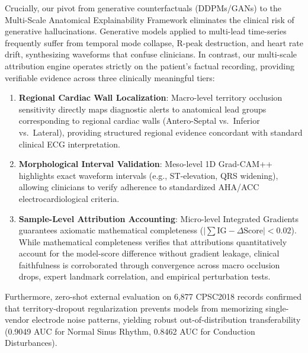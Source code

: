 \documentclass[12pt]{elsarticle}
\begin{document}
Crucially, our pivot from generative counterfactuals (DDPMs/GANs) to the Multi-Scale Anatomical Explainability Framework eliminates the clinical risk of generative hallucinations. Generative models applied to multi-lead time-series frequently suffer from temporal mode collapse, R-peak destruction, and heart rate drift, synthesizing waveforms that confuse clinicians. In contrast, our multi-scale attribution engine operates strictly on the patient's factual recording, providing verifiable evidence across three clinically meaningful tiers:
\begin{enumerate}
    \item \textbf{Regional Cardiac Wall Localization}: Macro-level territory occlusion sensitivity directly maps diagnostic alerts to anatomical lead groups corresponding to regional cardiac walls (Antero-Septal vs.\ Inferior vs.\ Lateral), providing structured regional evidence concordant with standard clinical ECG interpretation.
    \item \textbf{Morphological Interval Validation}: Meso-level 1D Grad-CAM++ highlights exact waveform intervals (e.g., ST-elevation, QRS widening), allowing clinicians to verify adherence to standardized AHA/ACC electrocardiological criteria.
    \item \textbf{Sample-Level Attribution Accounting}: Micro-level Integrated Gradients guarantees axiomatic mathematical completeness ($|\sum \text{IG} - \Delta \text{Score}| < 0.02$). While mathematical completeness verifies that attributions quantitatively account for the model-score difference without gradient leakage, clinical faithfulness is corroborated through convergence across macro occlusion drops, expert landmark correlation, and empirical perturbation tests.
\end{enumerate}

Furthermore, zero-shot external evaluation on 6,877 CPSC2018 records confirmed that territory-dropout regularization prevents models from memorizing single-vendor electrode noise patterns, yielding robust out-of-distribution transferability (0.9049 AUC for Normal Sinus Rhythm, 0.8462 AUC for Conduction Disturbances).
\end{document}
